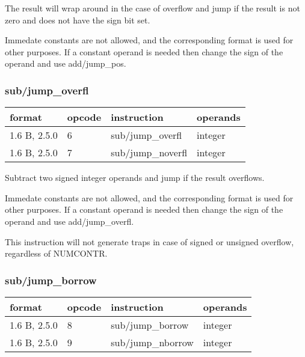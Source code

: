 \documentclass[forwardcom.tex]{subfiles}
\begin{document}
The result will wrap around in the case of overflow and jump if the result is not zero and does not have the sign bit set.
\vspace{2mm}

Immedate constants are not allowed, and the corresponding format is used for other purposes.
If a constant operand is needed then change the sign of the operand and use add/jump\_pos. 

\subsubsection{sub/jump\_overfl}
\label{table:subJumpOverflInstruction}
\begin{tabular}{|p{20mm}|p{12mm}|p{56mm}|p{50mm}|}
\hline
\bfseries format & \bfseries opcode & \bfseries instruction & \bfseries operands \\ \hline
1.6 B, 2.5.0 &  6 & sub/jump\_overfl & integer \\ \hline
1.6 B, 2.5.0 &  7 & sub/jump\_noverfl & integer\\ \hline
\end{tabular}
\vspace{2mm}

Subtract two signed integer operands and jump if the result overflows.
\vspace{2mm}

Immedate constants are not allowed, and the corresponding format is used for other purposes.
If a constant operand is needed then change the sign of the operand and use add/jump\_overfl. 
\vspace{2mm}

This instruction will not generate traps in case of signed or unsigned overflow, regardless of  NUMCONTR.
\vspace{2mm}

\subsubsection{sub/jump\_borrow}
\label{table:subJumpBorrowInstruction}
\begin{tabular}{|p{20mm}|p{12mm}|p{56mm}|p{50mm}|}
\hline
\bfseries format & \bfseries opcode & \bfseries instruction & \bfseries operands \\ \hline
1.6 B, 2.5.0 &  8 & sub/jump\_borrow & integer \\ \hline
1.6 B, 2.5.0 &  9 & sub/jump\_nborrow & integer\\ \hline
\end{tabular}
\vspace{2mm}
\end{document}
